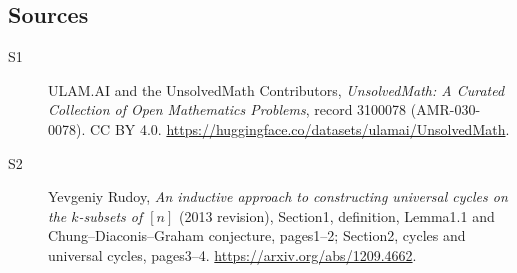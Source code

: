 \documentclass[11pt]{article}
\begin{document}
\subsection{Sources}
\begin{description}
\item[\hypertarget{source:3100078:1}{S1}] ULAM.AI and the UnsolvedMath Contributors, \emph{UnsolvedMath: A Curated Collection of Open Mathematics Problems}, record 3100078 (AMR-030-0078). CC BY 4.0. \url{https://huggingface.co/datasets/ulamai/UnsolvedMath}.
\item[\hypertarget{source:3100078:2}{S2}] Yevgeniy Rudoy, \emph{An inductive approach to constructing universal cycles on the $k$-subsets of $[n]$} (2013 revision), Section1, definition, Lemma1.1 and Chung--Diaconis--Graham conjecture, pages1--2; Section2, cycles and universal cycles, pages3--4. \url{https://arxiv.org/abs/1209.4662}.
\end{description}
\label{end:3100078}
\end{document}
